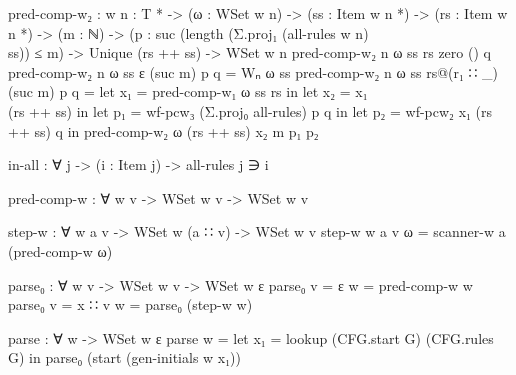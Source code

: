 		
		\begin{code}
			
			pred-comp-w₂ : {w n : T *} ->
			  (ω : WSet w n) ->
			  (ss : Item w n *) ->
			  (rs : Item w n *) ->
			  (m : ℕ) ->
			  (p : suc (length (Σ.proj₁ (all-rules {w} {n}) \\ ss)) ≤ m) ->
			  Unique (rs ++ ss) ->
			  WSet w n
			pred-comp-w₂ {n} ω ss rs zero () q
			pred-comp-w₂ {n} ω ss ε (suc m) p q = Wₙ ω ss
			pred-comp-w₂ {n} ω ss rs@(r₁ ∷ _) (suc m) p q =
			  let x₁ = pred-comp-w₁ ω ss rs in
			  let x₂ = x₁ \\ (rs ++ ss) in
			  let p₁ = wf-pcw₃ (Σ.proj₀ all-rules) p q in
			  let p₂ = wf-pcw₂ x₁ (rs ++ ss) q in
			  pred-comp-w₂ ω (rs ++ ss) x₂ m p₁ p₂

			in-all : ∀ {j} -> (i : Item j) -> all-rules j ∋ i
			
			pred-comp-w : ∀ {w v} -> WSet w v -> WSet w v
			
			step-w : ∀ {w a v} ->
			  WSet w (a ∷ v) ->
			  WSet w v
			step-w {w} {a} {v} ω = scanner-w a (pred-comp-w ω)
			
			parse₀ : ∀ {w v} ->
			   WSet w v ->
			   WSet w ε
			parse₀ {v = ε} w = pred-comp-w w
			parse₀ {v = x ∷ v} w = parse₀ (step-w w)
			
			parse : ∀ w -> WSet w ε
			parse w =
			  let x₁ = lookup (CFG.start G) (CFG.rules G) in
			  parse₀ (start (gen-initials w x₁))
		
		\end{code}
